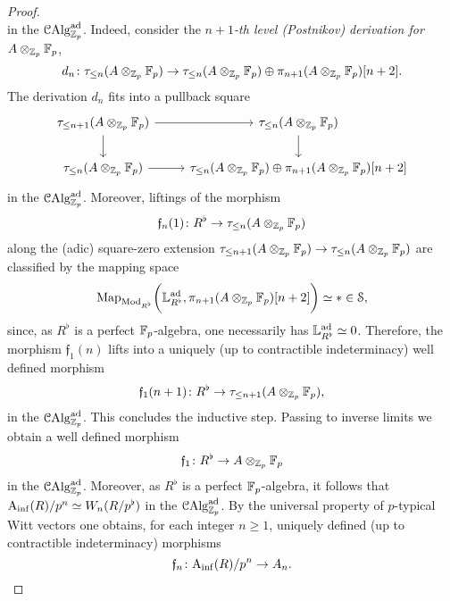 \documentclass[10pt,a4paper]{amsart}
\numberwithin{equation}{subsection}
\theoremstyle{definition}
\begin{document}
\begin{proof}
\[        \]
    in the \infcat $\mathcal C \mathrm{Alg}^{\mathrm{ad}}_{\mathbb Z_p}$. Indeed, consider the \emph{$n+1$-th level (Postnikov) derivation for $A \otimes_{\mathbb Z_p} \mathbb F_p$},
        \[
                d_n \colon \tau_{\leq n} (A \otimes_{\mathbb Z_p} \mathbb F_p) \to \tau_{\leq n}(A \otimes_{\mathbb Z_p} \mathbb F_p) \oplus \pi_{n+1}(A \otimes_{\mathbb Z_p} \mathbb F_p)[n+2].
        \]
    The derivation $d_n$ fits into a pullback square
        \[
        \begin{tikzcd}
                \tau_{\leq n+1} (A \otimes_{\bZp} \bF_p) \ar{r} \ar{d} & \tau_{\leq n}(A \otimes_{\bZp} \bF_p)   \ar{d} \\
                \tau_{\leq n} (A \otimes_{\bZp} \bF_p) \ar{r} & \tau_{\leq n}(A \otimes_{\bZp} \bF_p) \oplus \pi_{n+1}(A \otimes_{\bZp} \bF_p)[n+2]
        \end{tikzcd}
        \]
    in the \infcat $\mathcal C \mathrm{Alg}^{\mathrm{ad}}_{\mathbb Z_p}$. Moreover, liftings of the morphism 
        \[
            \mathfrak{f}_n(1) \colon R^\flat \to \tau_{\leq n}(A \otimes_{\mathbb Z_p} \mathbb F_p)
        \] 
    along the (adic) square-zero extension $\tau_{\leq n+1} (A \otimes_{\mathbb Z_p} \mathbb F_p ) \to \tau_{\leq n} (A \otimes_{\mathbb Z_p} \mathbb F_p)$ are classified by the mapping space
        \[
                \mathrm{Map}_{\mathrm{Mod}_{R^\flat}} \bigg(\mathbb{L}^{\mathrm{ad}}_{R^\flat}, \pi_{n+1}(A \otimes_{\mathbb Z_p} \mathbb F_p) [n+2] \bigg) \simeq * \in \mathcal S,
        \]
    since, as $R^\flat$ is a perfect $\mathbb F_p$-algebra, one necessarily has $\mathbb{L}^{\mathrm{ad}}_{R^\flat} \simeq 0$.
    Therefore, the morphism $\mathfrak{f}_1(n)$ lifts into a uniquely (up to contractible indeterminacy) well defined morphism
        \[
                \mathfrak{f}_1(n+1) \colon R^\flat \to \tau_{\leq n+1}(A \otimes_{\mathbb Z_p} \mathbb F_p),  
        \]
    in the \infcat $\mathcal C \mathrm{Alg}^{\mathrm{ad}}_{\mathbb Z_p}$. This concludes the inductive step. Passing to inverse limits we obtain a well defined morphism
        \[
                \mathfrak{f}_1 \colon R^\flat \to A \otimes_{\mathbb Z_p} \mathbb F_p
        \]
    in the \infcat $\mathcal C \mathrm{Alg}^{\mathrm{ad}}_{\mathbb Z_p}$.
    Moreover, as $R^\flat$ is a perfect $\mathbb F_p$-algebra, it follows that $\mathrm{A}_{\mathrm{inf}}(R)/p^n \simeq W_n(R/p^\flat)$ in the \infcat $\mathcal C \mathrm{Alg}^{\mathrm{ad}}_{\mathbb Z_p}$. By the universal property of $p$-typical Witt vectors one obtains, for each integer $n \geq 1$, uniquely defined (up to contractible indeterminacy) morphisms
        \[
            \mathfrak{f}_n \colon \mathrm{A}_{\mathrm{inf}}(R)/p^n \to A_n.
        \]  

\end{proof}
\end{document}
